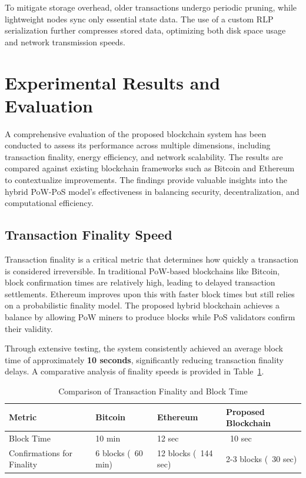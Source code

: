\documentclass[conference]{IEEEtran}
\begin{document}
To mitigate storage overhead, older transactions undergo periodic pruning, while lightweight nodes sync only essential state data. The use of a custom RLP serialization further compresses stored data, optimizing both disk space usage and network transmission speeds.

\section{Experimental Results and Evaluation}

A comprehensive evaluation of the proposed blockchain system has been conducted to assess its performance across multiple dimensions, including transaction finality, energy efficiency, and network scalability. The results are compared against existing blockchain frameworks such as Bitcoin and Ethereum to contextualize improvements. The findings provide valuable insights into the hybrid PoW-PoS model’s effectiveness in balancing security, decentralization, and computational efficiency.

\subsection{Transaction Finality Speed}
Transaction finality is a critical metric that determines how quickly a transaction is considered irreversible. In traditional PoW-based blockchains like Bitcoin, block confirmation times are relatively high, leading to delayed transaction settlements. Ethereum improves upon this with faster block times but still relies on a probabilistic finality model. The proposed hybrid blockchain achieves a balance by allowing PoW miners to produce blocks while PoS validators confirm their validity. 

Through extensive testing, the system consistently achieved an average block time of approximately \textbf{10 seconds}, significantly reducing transaction finality delays. A comparative analysis of finality speeds is provided in Table~\ref{tab:finality}.

\begin{table}[h]
    \centering
    \caption{Comparison of Transaction Finality and Block Time}
    \label{tab:finality}
    \begin{tabularx}{\linewidth}{|X|X|X|X|}
        \hline
        \textbf{Metric} & \textbf{Bitcoin} & \textbf{Ethereum} & \textbf{Proposed Blockchain} \\
        \hline
        Block Time & 10 min & 12 sec & ~10 sec \\
        \hline
        Confirmations for Finality & 6 blocks (~60 min) & 12 blocks (~144 sec) & 2-3 blocks (~30 sec) \\
        \hline
    \end{tabularx}
\end{table}
\end{document}
